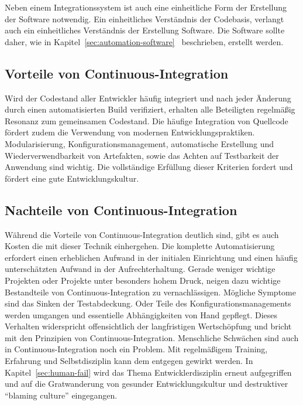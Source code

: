 Neben einem Integrationssystem ist auch eine einheitliche Form der Erstellung der Software notwendig. Ein einheitliches Verständnis der Codebasis, verlangt auch ein einheitliches Verständnis der Erstellung Software. Die Software sollte daher, wie in Kapitel~\ref{sec:automation-software}~ beschrieben, erstellt werden.


\subsection{Vorteile von Continuous-Integration}

Wird der Codestand aller Entwickler häufig integriert und nach jeder Änderung durch einen automatisierten Build verifiziert, erhalten alle Beteiligten regelmäßig Resonanz zum gemeinsamen Codestand.
Die häufige Integration von Quellcode fördert zudem die Verwendung von modernen Entwicklungspraktiken. Modularisierung, Konfigurationsmanagement, automatische Erstellung und Wiederverwendbarkeit von Artefakten, sowie das Achten auf Testbarkeit der Anwendung sind wichtig. Die vollständige Erfüllung dieser Kriterien fordert und fördert eine gute Entwicklungskultur.

\subsection{Nachteile von Continuous-Integration}

Während die Vorteile von Continuous-Integration deutlich sind, gibt es auch Kosten die mit dieser Technik einhergehen. 
Die komplette Automatisierung erfordert einen erheblichen Aufwand in der initialen Einrichtung und einen häufig 
unterschätzten Aufwand in der Aufrechterhaltung. Gerade weniger wichtige Projekten oder Projekte unter besonders hohem 
Druck, neigen dazu wichtige Bestandteile von Continuous-Integration zu vernachlässigen. Mögliche Symptome sind das Sinken 
der Testabdeckung. Oder Teile des Konfigurationsmanagements werden umgangen und essentielle Abhängigkeiten von Hand 
gepflegt. Dieses Verhalten widerspricht offensichtlich der langfristigen Wertschöpfung und bricht mit den Prinzipien von 
Continuous-Integration. Menschliche Schwächen sind auch in Continuous-Integration noch ein Problem. Mit regelmäßigem 
Training, Erfahrung und Selbstdisziplin kann dem entgegen gewirkt werden. In Kapitel~\ref{sec:human-fail} wird das Thema 
Entwicklerdisziplin erneut aufgegriffen und auf die Gratwanderung von gesunder Entwicklungskultur und destruktiver 
``blaming culture'' eingegangen.

